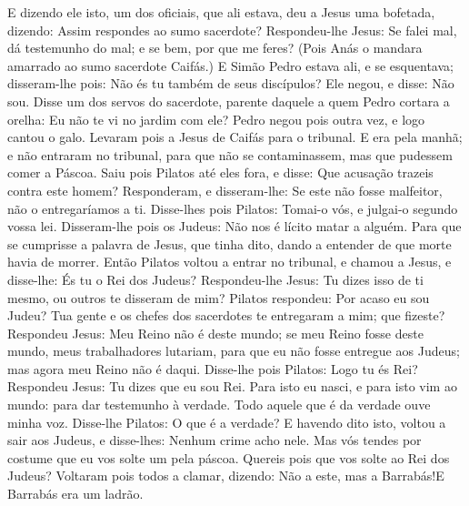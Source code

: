{  E dizendo ele isto, um dos oficiais, que ali estava, deu a Jesus uma bofetada, dizendo: Assim respondes ao sumo sacerdote?
  Respondeu-lhe Jesus: Se falei mal, dá testemunho do mal; e se bem, por que me feres?
  (Pois Anás o mandara amarrado ao sumo sacerdote Caifás.)
  E Simão Pedro estava ali, e se esquentava; disseram-lhe pois: Não és tu também de seus discípulos? Ele negou, e disse: Não sou.
  Disse um dos servos do sacerdote, parente daquele a quem Pedro cortara a orelha: Eu não te vi no jardim com ele?
  Pedro negou pois outra vez, e logo cantou o galo.
  Levaram pois a Jesus de Caifás para o tribunal. E era pela manhã; e não entraram no tribunal, para que não se contaminassem, mas que pudessem comer a Páscoa.
  Saiu pois Pilatos até eles fora, e disse: Que acusação trazeis contra este homem?
  Responderam, e disseram-lhe: Se este não fosse malfeitor, não o entregaríamos a ti.
  Disse-lhes pois Pilatos: Tomai-o vós, e julgai-o segundo vossa lei. Disseram-lhe pois os Judeus: Não nos é lícito matar a alguém.
  Para que se cumprisse a palavra de Jesus, que tinha dito, dando a entender de que morte havia de morrer.
  Então Pilatos voltou a entrar no tribunal, e chamou a Jesus, e disse-lhe: És tu o Rei dos Judeus?
  Respondeu-lhe Jesus: Tu dizes isso de ti mesmo, ou outros te disseram de mim?
  Pilatos respondeu: Por acaso eu sou Judeu? Tua gente e os chefes dos sacerdotes te entregaram a mim; que fizeste?
  Respondeu Jesus: Meu Reino não é deste mundo; se meu Reino fosse deste mundo, meus trabalhadores lutariam, para que eu não fosse entregue aos Judeus; mas agora meu Reino não é daqui.
  Disse-lhe pois Pilatos: Logo tu és Rei? Respondeu Jesus: Tu dizes que eu sou Rei. Para isto eu nasci, e para isto vim ao mundo: para dar testemunho à verdade. Todo aquele que é da verdade ouve minha voz.
  Disse-lhe Pilatos: O que é a verdade? E havendo dito isto, voltou a sair aos Judeus, e disse-lhes: Nenhum crime acho nele.
  Mas vós tendes por costume que eu vos solte um pela páscoa. Quereis pois que vos solte ao Rei dos Judeus?
  Voltaram pois todos a clamar, dizendo: Não a este, mas a Barrabás!E Barrabás era um ladrão.
\par }

